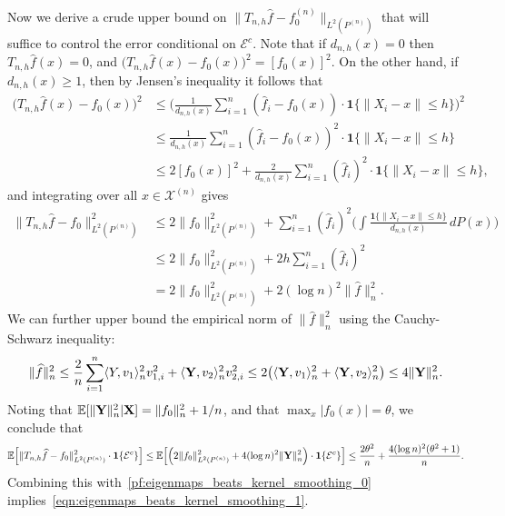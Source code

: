 \documentclass[aos]{imsart}
\theoremstyle{plain}
\theoremstyle{definition}
\theoremstyle{remark}
\newcommand{\Ebb}{\mathbb{E}}
\newcommand{\dotp}[2]{\langle #1, #2 \rangle}
\newcommand{\wh}[1]{\widehat{#1}}
\newcommand{\mc}[1]{\mathcal{#1}}
\newcommand{\1}{\mathbf{1}}
\begin{document}
Now we derive a crude upper bound on $\|T_{n,h}\wh{f} - f_0^{(n)}\|_{L^2(P^{(n)})}$ that will suffice to control the error conditional on $\mc{E}^c$. Note that if $d_{n,h}(x) = 0$ then
$T_{n,h}\wh{f}(x) = 0$, and $\bigl(T_{n,h}\wh{f}(x) - f_0(x)\bigr)^2 = [f_0(x)]^2$. On the other hand, if $d_{n,h}(x) \geq 1$, then by Jensen's inequality it follows that
\begin{align*}
\bigl(T_{n,h}\wh{f}(x) - f_0(x)\bigr)^2 & \leq \biggl(\frac{1}{d_{n,h}(x)} \sum_{i = 1}^{n} (\wh{f}_i - f_0(x)) \cdot \1\{\|X_i - x\| \leq h \}\biggr)^2 \\
& \leq \frac{1}{d_{n,h}(x)} \sum_{i = 1}^{n} (\wh{f}_i - f_0(x))^2 \cdot \1\{\|X_i - x\| \leq h \} \\
& \leq 2[f_0(x)]^2 + \frac{2}{d_{n,h}(x)} \sum_{i = 1}^{n} (\wh{f}_i)^2 \cdot \1\{\|X_i - x\| \leq h\},
\end{align*}
and integrating over all $x \in \mc{X}^{(n)}$ gives
\begin{align*}
\|T_{n,h}\wh{f} - f_0\|_{L^2(P^{(n)})}^2 & \leq 2 \|f_0\|_{L^2(P^{(n)})}^2 + \sum_{i = 1}^{n} (\wh{f}_i)^2 \biggl(\int \frac{\1\{\|X_i - x\| \leq h \}}{d_{n,h}(x)} \,dP(x)\biggr) \\
& \leq 2 \|f_0\|_{L^2(P^{(n)})}^2 + 2h\sum_{i = 1}^{n} (\wh{f}_i)^2 \\
& = 2 \|f_0\|_{L^2(P^{(n)})}^2 + 2 (\log n)^2 \|\wh{f}\|_n^2.
\end{align*}
We can further upper bound the empirical norm of $\|\wh{f}\|_n^2$ using the Cauchy-Schwarz inequality:
\begin{equation*}
\|\wh{f}\|_n^2 \leq \frac{2}{n}\sum_{i = 1}^{n}\dotp{Y}{v_1}_n^2v_{1,i}^2 + \dotp{{\bf Y}}{v_2}_n^2v_{2,i}^2 \leq 2\bigl(\dotp{{\bf Y}}{v_1}_n^2 + \dotp{{\bf Y}}{v_2}_n^2\bigr) \leq 4 \|{\bf Y}\|_n^2. 
\end{equation*}
Noting that $\Ebb[\|{\bf Y}\|_n^2|{\bf X}] = \|f_0\|_n^2 + 1/n$, and that $\max_x |f_0(x)| = \theta$, we conclude that
\begin{equation*}
\Ebb\Bigl[\|T_{n,h}\wh{f} - f_0\|_{L^2(P^{(n)})}^2 \cdot \1\{\mc{E}^c\}\Bigr] \leq \Ebb\Bigl[\Bigl(2 \|f_0\|_{L^2(P^{(n)})}^2 + 4 (\log n)^2 \|{\bf Y}\|_n^2\Bigr) \cdot \1\{\mc{E}^c\} \Bigr] \leq \frac{2 \theta^2}{n} + \frac{4 (\log n)^2(\theta^2 + 1)}{n}.
\end{equation*}
Combining this with~\eqref{pf:eigenmaps_beats_kernel_smoothing_0} implies~\eqref{eqn:eigenmaps_beats_kernel_smoothing_1}.
\end{document}
